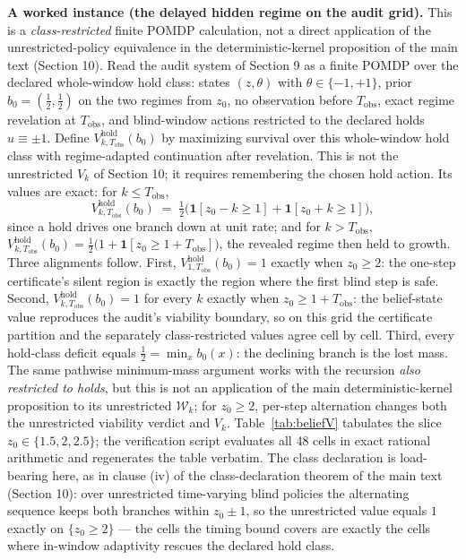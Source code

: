 \documentclass[11pt]{article}
\theoremstyle{definition}
\begin{document}
\textbf{A worked instance (the delayed hidden regime on the audit grid).} This is a \emph{class-restricted} finite POMDP calculation, not a direct application of the unrestricted-policy equivalence in the deterministic-kernel proposition of the main text (Section 10). Read the audit system of Section 9 as a finite POMDP over the declared whole-window hold class: states \((z,\theta)\) with \(\theta \in \{-1,+1\}\), prior \(b_{0} = (\tfrac{1}{2}, \tfrac{1}{2})\) on the two regimes from \(z_{0}\), no observation before \(T_{\mathrm{obs}}\), exact regime revelation at \(T_{\mathrm{obs}}\), and blind-window actions restricted to the declared holds \(u \equiv \pm 1\). Define \(V^{\mathrm{hold}}_{k,T_{\mathrm{obs}}}(b_0)\) by maximizing survival over this whole-window hold class with regime-adapted continuation after revelation. This is not the unrestricted \(V_k\) of Section 10; it requires remembering the chosen hold action. Its values are exact: for \(k \le T_{\mathrm{obs}}\),
\[
V^{\mathrm{hold}}_{k,T_{\mathrm{obs}}}(b_{0}) \;=\; \tfrac{1}{2}\bigl(\mathbf{1}[z_{0} - k \ge 1] + \mathbf{1}[z_{0} + k \ge 1]\bigr),
\]
since a hold drives one branch down at unit rate; and for \(k > T_{\mathrm{obs}}\),
\(V^{\mathrm{hold}}_{k,T_{\mathrm{obs}}}(b_{0}) = \tfrac{1}{2}\bigl(1 + \mathbf{1}[z_{0} \ge 1 + T_{\mathrm{obs}}]\bigr)\), the revealed regime then held to growth. Three alignments follow. First, \(V^{\mathrm{hold}}_{1,T_{\mathrm{obs}}}(b_{0}) = 1\) exactly when \(z_{0} \ge 2\): the one-step certificate's silent region is exactly the region where the first blind step is safe. Second, \(V^{\mathrm{hold}}_{k,T_{\mathrm{obs}}}(b_{0}) = 1\) for every \(k\) exactly when \(z_{0} \ge 1 + T_{\mathrm{obs}}\): the belief-state value reproduces the audit's viability boundary, so on this grid the certificate partition and the separately class-restricted values agree cell by cell. Third, every hold-class deficit equals \(\tfrac{1}{2}=\min_x b_0(x)\): the declining branch is the lost mass. The same pathwise minimum-mass argument works with the recursion \emph{also restricted to holds}, but this is not an application of the main deterministic-kernel proposition to its unrestricted \(\mathcal W_k\); for \(z_0\ge2\), per-step alternation changes both the unrestricted viability verdict and \(V_k\). Table~\ref{tab:beliefV} tabulates the slice \(z_{0} \in \{1.5, 2, 2.5\}\); the verification script evaluates all 48 cells in exact rational arithmetic and regenerates the table verbatim. The class declaration is load-bearing here, as in clause (iv) of the class-declaration theorem of the main text (Section 10): over unrestricted time-varying blind policies the alternating sequence keeps both branches within \(z_{0} \pm 1\), so the unrestricted value equals \(1\) exactly on \(\{z_{0} \ge 2\}\) --- the cells the timing bound covers are exactly the cells where in-window adaptivity rescues the declared hold class.
\end{document}
